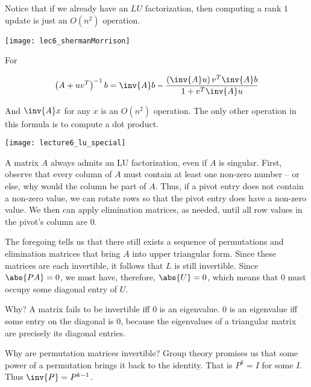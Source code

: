 \documentclass[../main.tex]{subfiles}
\begin{document}
\begin{remark}
    Notice that if we already have an $LU$ factorization, then computing a rank $1$ update is just an $O(n^2)$ operation.
\begin{center}
    \texttt{[image: lec6\_shermanMorrison]}
\end{center}

For 

\[
    \left( A + uv^T \right)^{-1}b = \inv{A}b - \frac{\left( \inv{A}u \right)v^T\inv{A}b}{1 + v^T\inv{A}u}
\]

And $\inv{A}x$ for any $x$ is an $O(n^2)$ operation. The only other operation in this formula is to compute a dot product.
\end{remark}

\begin{remark}
    \begin{center}
        \texttt{[image: lecture6\_lu\_special]}
    \end{center}

    A matrix $A$ always admits an LU factorization, even if $A$
    is singular. First, observe that every column of $A$ must contain
    at least one non-zero number -- or else, why would the column
    be part of $A$. Thus, if a pivot entry does not contain a non-zero
    value, we can rotate rows so that the pivot entry does have
    a non-zero value. We then can apply elimination matrices, as needed,
    until all row values in the pivot's column are $0$. 

    The foregoing tells us that there still exists a sequence of
    permutations and elimination matrices that bring $A$ into upper
    triangular form. Since these matrices are each invertible, it follows that $L$ is still invertible. Since $\abs{PA} = 0$, we must have, therefore, $\abs{U} = 0$, which means that $0$ must occupy some diagonal entry of $U$.

    Why? A matrix fails to be invertible iff $0$ is an eigenvalue. $0$ is an eigenvalue iff some entry on the diagonal is $0$, because the eigenvalues of a triangular matrix are precisely its diagonal entries.

    Why are permutation matrices invertible? Group theory promises us that some power of a permutation brings it back to the identity. That is $P^k = I$ for some $I$. Thus $\inv{P} = P^{k-1}$.
\end{remark}
\end{document}
